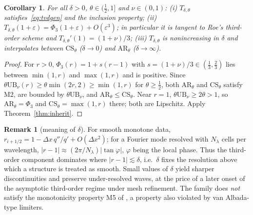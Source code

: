 \documentclass[11pt]{article}
\newcommand{\UB}{\mathrm{UB}}
\theoremstyle{plain}
\newtheorem{corollary}[theorem]{Corollary}
\theoremstyle{definition}
\newtheorem{remark}[theorem]{Remark}
\begin{document}
\begin{corollary}\label{cor:topbee}
For all $\delta>0$, $\theta\in(\frac12,1]$ and $\nu\in(0,1)$:
(i) $T_{\delta,\theta}$ satisfies~\eqref{eq:tvdgen} and the inclusion property;
(ii) $T_{\delta,\theta}(1+\varepsilon)=\Phi_3(1+\varepsilon)+O(\varepsilon^3)$; in particular it is tangent to Roe's third-order scheme and $T_{\delta,\theta}'(1)=(1+\nu)/3$;
(iii) $T_{\delta,\theta}$ is nonincreasing in $\delta$ and interpolates between $\mathrm{CS}_\theta$ ($\delta\to0$) and $\mathrm{AR}_\theta$ ($\delta\to\infty$).
\end{corollary}
\begin{proof}
For $r>0$, $\Phi_3(r)=1+s(r-1)$ with $s=(1+\nu)/3\in(\frac13,\frac23)$ lies between $\min(1,r)$ and $\max(1,r)$ and is positive. Since $\theta\UB_\nu(r)\ge\theta\min(2r,2)\ge\min(1,r)$ for $\theta\ge\frac12$, both $\mathrm{AR}_\theta$ and $\mathrm{CS}_\theta$ satisfy M2, are bounded by $\theta\UB_\nu$, and $\mathrm{AR}_\theta\le\mathrm{CS}_\theta$. Near $r=1$, $\theta\UB_\nu\ge2\theta>1$, so $\mathrm{AR}_\theta=\Phi_3$ and $\mathrm{CS}_\theta=\max(1,r)$ there; both are Lipschitz. Apply Theorem~\ref{thm:inherit}.
\end{proof}

\begin{remark}[meaning of $\delta$]
For smooth monotone data, $r_{i+1/2}=1-\Delta x\,q''/q'+O(\Delta x^2)$; for a Fourier mode resolved with $N_\lambda$ cells per wavelength, $|r-1|\approx(2\pi/N_\lambda)|\tan\varphi|$, $\varphi$ being the local phase. Thus the third-order component dominates where $|r-1|\lesssim\delta$, i.e.\ $\delta$ fixes the resolution above which a structure is treated as smooth. Small values of $\delta$ yield sharper discontinuities and preserve under-resolved waves, at the price of a later onset of the asymptotic third-order regime under mesh refinement. The family does \emph{not} satisfy the monotonicity property M5 of \cite{Kemm2011}, a property also violated by van Albada-type limiters.
\end{remark}

\end{document}
